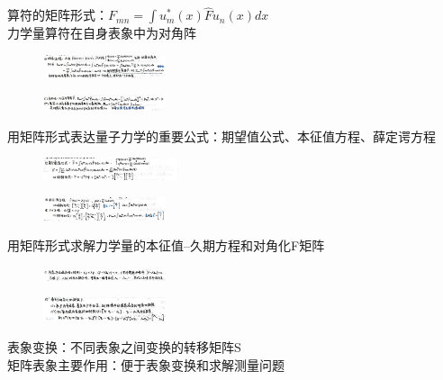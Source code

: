 \documentclass[a4paper,8pt]{extarticle} %
\begin{document}
\begin{multicols}{3}
算符的矩阵形式：$F_{mn}= \int u_m^*(x) \hat{F}u_n(x) dx$\\
力学量算符在自身表象中为对角阵\\
\begin{figure}[H]
    \vspace{-0.5cm}
    \centering
    \includegraphics[width=0.32\textwidth]{images/13.png}
    \vspace{-0.6cm}
\end{figure}
\begin{figure}[H]
    \vspace{-0.5cm}
    \centering
    \includegraphics[width=0.32\textwidth]{images/14.png}
    \vspace{-0.6cm}
\end{figure}
用矩阵形式表达量子力学的重要公式：期望值公式、本征值方程、薛定谔方程\\
\begin{figure}[H]
    \vspace{-0.5cm}
    \centering
    \includegraphics[width=0.35\textwidth]{images/15.png}
    \vspace{-0.6cm}
\end{figure}
\begin{figure}[H]
    \vspace{-0.5cm}
    \centering
    \includegraphics[width=0.32\textwidth]{images/16.png}
    \vspace{-0.6cm}
\end{figure}
用矩阵形式求解力学量的本征值--久期方程和对角化F矩阵
\begin{figure}[H]
    \vspace{-0.6cm}
    \centering
    \includegraphics[width=0.32\textwidth]{images/17.png}
    \vspace{-0.6cm}
\end{figure}
\begin{figure}[H]
    \centering
    \includegraphics[width=0.32\textwidth]{images/18.png}
    \vspace{-0.6cm}
\end{figure}
表象变换：不同表象之间变换的转移矩阵S\\
矩阵表象主要作用：便于表象变换和求解测量问题


\end{multicols}
\end{document}
